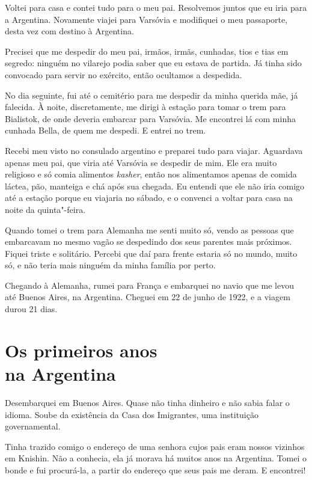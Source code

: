 Voltei para casa e contei tudo para o meu pai. Resolvemos juntos que eu
iria para a Argentina. Novamente viajei para Varsóvia e
modifiquei o meu passaporte, desta vez com destino à Argentina.

Precisei que me despedir do meu pai, irmãos, irmãs, cunhadas, tios e tias em
segredo: ninguém no vilarejo podia saber que eu estava de partida. Já tinha 
sido convocado para servir no exército, então ocultamos a despedida.

No dia seguinte, fui até o cemitério para me despedir da minha querida
mãe, já falecida. À noite, discretamente, me dirigi à estação para
tomar o trem para Bialistok, de onde deveria embarcar para Varsóvia. Me encontrei lá 
com minha cunhada Bella, de quem me despedi. E entrei no trem.

Recebi meu visto no consulado argentino e preparei tudo para
viajar. Aguardava apenas meu pai, que viria até Varsóvia se despedir de mim.
Ele era muito religioso e só comia alimentos \textit{kasher}, então nos
alimentamos apenas de comida láctea, pão,
manteiga e chá após sua chegada. Eu entendi que ele não iria comigo até a estação porque
eu viajaria no sábado, e o convenci a voltar para casa na
noite da quinta"-feira. 

Quando tomei o trem para Alemanha me senti muito só, vendo as pessoas que embarcavam no mesmo vagão se despedindo
dos seus parentes mais próximos. Fiquei triste e solitário. Percebi que daí para frente estaria
só no mundo, muito só, e não teria mais ninguém da minha família por perto.

Chegando à Alemanha, rumei para França e embarquei no navio que me
levou até Buenos Aires, na Argentina. Cheguei em 22 de junho de 1922, e a viagem durou 21 dias.

\chapter*{Os primeiros anos\\na Argentina}

Desembarquei em Buenos Aires. Quase não tinha dinheiro e não sabia falar
o idioma. Soube da existência da Casa dos Imigrantes, uma instituição governamental.

Tinha trazido comigo o endereço de uma senhora cujos pais eram nossos
vizinhos em Knishin. Não a conhecia, ela já morava há muitos anos
na Argentina. Tomei o bonde e fui procurá-la, a partir do endereço que seus pais me deram. E encontrei!

